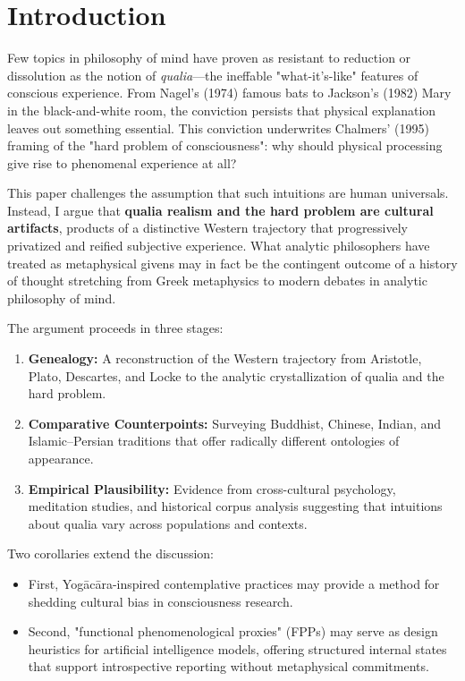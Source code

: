 \documentclass[11pt,a4paper]{article}
\newcommand{\qualia}{\emph{qualia}}
\begin{document}
\tableofcontents
\newpage

\section{Introduction}

Few topics in philosophy of mind have proven as resistant to reduction or dissolution as the notion of \qualia{}—the ineffable "what-it's-like" features of conscious experience. From Nagel's (1974) famous bats to Jackson's (1982) Mary in the black-and-white room, the conviction persists that physical explanation leaves out something essential. This conviction underwrites Chalmers' (1995) framing of the "hard problem of consciousness": why should physical processing give rise to phenomenal experience at all?

This paper challenges the assumption that such intuitions are human universals. Instead, I argue that \textbf{qualia realism and the hard problem are cultural artifacts}, products of a distinctive Western trajectory that progressively privatized and reified subjective experience. What analytic philosophers have treated as metaphysical givens may in fact be the contingent outcome of a history of thought stretching from Greek metaphysics to modern debates in analytic philosophy of mind.

The argument proceeds in three stages:

\begin{enumerate}
\item \textbf{Genealogy:} A reconstruction of the Western trajectory from Aristotle, Plato, Descartes, and Locke to the analytic crystallization of qualia and the hard problem.
\item \textbf{Comparative Counterpoints:} Surveying Buddhist, Chinese, Indian, and Islamic–Persian traditions that offer radically different ontologies of appearance.
\item \textbf{Empirical Plausibility:} Evidence from cross-cultural psychology, meditation studies, and historical corpus analysis suggesting that intuitions about qualia vary across populations and contexts.
\end{enumerate}

Two corollaries extend the discussion:

\begin{itemize}
\item First, Yogācāra-inspired contemplative practices may provide a method for shedding cultural bias in consciousness research.
\item Second, "functional phenomenological proxies" (FPPs) may serve as design heuristics for artificial intelligence models, offering structured internal states that support introspective reporting without metaphysical commitments.
\end{itemize}
\end{document}
